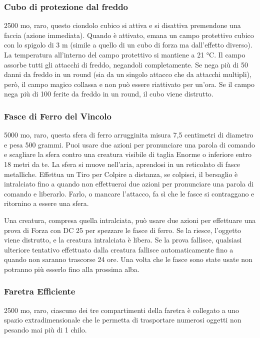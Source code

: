 \begin{multicols}{2}
\subsubsection*{Cubo di protezione dal freddo}
2500 mo, raro, questo ciondolo cubico si attiva e si disattiva premendone una faccia (azione immediata). Quando è attivato, emana un campo protettivo cubico con lo spigolo di 3 m (simile a quello di un cubo di forza ma dall'effetto diverso). La temperatura all’interno del campo protettivo si mantiene a 21 °C. Il campo assorbe tutti gli attacchi di freddo, negandoli completamente. Se nega più di 50 danni da freddo in un round (sia da un singolo attacco che da attacchi multipli), però, il campo magico collassa e non può essere riattivato per un'ora. Se il campo nega più di 100 ferite da freddo in un round, il cubo viene distrutto.

\subsubsection*{Fasce di Ferro del Vincolo}
5000 mo, raro, questa sfera di ferro arrugginita misura 7,5 centimetri di diametro e pesa 500 grammi. Puoi usare due azioni per pronunciare una parola di comando e scagliare la sfera contro una creatura visibile di taglia Enorme o inferiore entro 18 metri da te. La sfera si muove nell'aria, aprendosi in un reticolato di fasce metalliche. Effettua un Tiro per Colpire a distanza, se colpisci, il bersaglio è intralciato fino a quando non effettuerai due azioni per pronunciare una parola di comando e liberarlo. Farlo, o mancare l'attacco, fa sì che le fasce si contraggano e ritornino a essere una sfera.

Una creatura, compresa quella intralciata, può usare due azioni per effettuare una prova di Forza con DC 25 per spezzare le fasce di ferro. Se la riesce, l'oggetto viene distrutto, e la creatura intralciata è libera. Se la prova fallisce, qualsiasi ulteriore tentativo effettuato dalla creatura fallisce automaticamente fino a quando non saranno trascorse 24 ore. Una volta che le fasce sono state usate non potranno più esserlo fino alla prossima alba.

\subsubsection*{Faretra Efficiente}
2500 mo, raro, ciascuno dei tre compartimenti della faretra è collegato a uno spazio extradimensionale che le permetta di trasportare numerosi oggetti non pesando mai più di 1 chilo.


\end{multicols}
